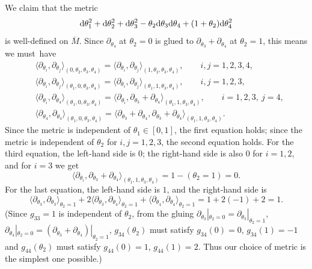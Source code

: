 \documentclass[10pt,a4paper]{amsart}
\numberwithin{equation}{section}
\theoremstyle{definition}
\newcommand{\om}{\overline{M}}
\begin{document}
We claim that the metric
\begin{equation*}
{\rm d}\theta_1^2 + {\rm d}\theta_2^2 + {\rm d}\theta_3^2 -\theta_2{\rm d}\theta_3 {\rm d}\theta_4 + (1+\theta_2){\rm d}\theta_4^2
\end{equation*}
is well-defined on $\om$.
Since $\partial_{\theta_4}$ at $\theta_2=0$ is glued to
$\partial_{\theta_3} + \partial_{\theta_4}$ at $\theta_2 = 1$, this means we must~have%
\begin{align*}
&\langle \partial_{\theta_i},\partial_{\theta_j}\rangle_{(0,\theta_2,\theta_3,\theta_4)}
= \langle \partial_{\theta_i},\partial_{\theta_j}\rangle_{(1,\theta_2,\theta_3,\theta_4)},
\qquad i,j = 1,2,3,4,\\
&\langle \partial_{\theta_i},\partial_{\theta_j}\rangle_{(\theta_1,0,\theta_3,\theta_4)}
= \langle \partial_{\theta_i},\partial_{\theta_j}\rangle_{(\theta_1,1,\theta_3,\theta_4)},\qquad i, j = 1, 2, 3,\\
&\langle \partial_{\theta_i},\partial_{\theta_4}\rangle_{(\theta_1,0,\theta_3,\theta_4)}
= \langle \partial_{\theta_i},\partial_{\theta_3} + \partial_{\theta_4}\rangle_{(\theta_1,1,\theta_3,\theta_4)},\qquad
i = 1,2,3,\ j = 4,\\
&\langle \partial_{\theta_4},\partial_{\theta_4}\rangle_{(\theta_1,0,\theta_3,\theta_4)}
= \langle \partial_{\theta_3} + \partial_{\theta_4},\partial_{\theta_3} + \partial_{\theta_4}\rangle_{(\theta_1,1,\theta_3,\theta_4)}.
\end{align*}
Since the metric is independent of $\theta_1\in [0,1]$, the first equation holds; since
the metric is independent of $\theta_2$ for $i,j = 1,2,3$, the second equation holds.
 For the third equation, the left-hand side is $0$; the right-hand side is also $0$ for $i=1,2$, and for $i=3$ we get
\[\langle \partial_{\theta_i},\partial_{\theta_3} + \partial_{\theta_4}\rangle_{(\theta_1,1,\theta_3,\theta_4)}
= 1 - (\theta_2 = 1) = 0.\]
For the last equation, the left-hand side is $1$, and the right-hand side is
\[\langle\partial_{\theta_3},\partial_{\theta_3}\rangle_{\theta_2=1} +
2\langle\partial_{\theta_3},\partial_{\theta_4}\rangle_{\theta_2=1} +
\langle\partial_{\theta_4},\partial_{\theta_4}\rangle_{\theta_2=1}
= 1 +2 (-1) + 2 = 1.\]
(Since $g_{33} = 1$ is independent of $\theta_2$, from the gluing
$\partial_{\theta_3}|_{\theta_2=0} = \partial_{\theta_3}|_{\theta_2=1}$, $\partial_{\theta_4}|_{\theta_2=0} = (\partial_{\theta_3}+\partial_{\theta_4})|_{\theta_2=1}$,
$g_{34}(\theta_2)$ must satisfy $g_{34}(0) = 0$, $g_{34}(1) = -1$ and $g_{44}(\theta_2)$ must satisfy $g_{44}(0) = 1$, $g_{44}(1) = 2$. Thus our choice of metric is the simplest one possible.)
\end{document}
